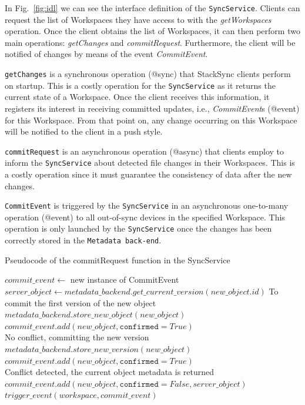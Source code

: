 In Fig.~\ref{fig:idl} we can see the interface definition of the \texttt{SyncService}. Clients can request the list of Workspaces they have access to with the \textit{getWorkspaces} operation. Once the client obtains the list of Workspaces, it can then perform two main operations: \textit{getChanges} and  \textit{commitRequest}. Furthermore, the client will be notified of changes  by means of the event \textit{CommitEvent}.

\texttt{getChanges} is a synchronous operation (@sync) that StackSync clients perform on startup. This is a costly operation for the \texttt{SyncService} as it returns the current state of a Workspace. Once the client receives this information, it registers its interest in receiving committed updates, i.e., \textit{CommitEvent}s (@event) for this Workspace. From that point on, any change occurring on this Workspace will be notified to the client in a push style.

\texttt{commitRequest} is an asynchronous operation (@async) that clients employ to inform the \texttt{SyncService} about
detected file changes in their Workspaces.  This is a  costly operation since it must guarantee the consistency of data after the new changes. 

\texttt{CommitEvent} is triggered by the \texttt{SyncService} in  an asynchronous one-to-many operation (@event) to all out-of-sync devices in the specified Workspace. This operation is only launched by the \texttt{SyncService} once the changes has been correctly stored in the \texttt{Metadata back-end}.

\begin{algorithm}[h]
  \caption{Pseudocode of the commitRequest function in the SyncService}
    \label{alg:commit_pseudocode}
  \begin{algorithmic}[1]
  	\footnotesize
      \State $commit\_event \gets $ new instance of CommitEvent
      	\State $server\_object \gets metadata\_backend.get\_current\_version(new\_object.id)$
          	\Comment To commit the first version of the new object
        	\State $metadata\_backend.store\_new\_object(new\_object)$
        	\State $commit\_event.add(new\_object, \mathtt{confirmed} = True)$
         	\\ \Comment No conflict, committing the new version
			\State $metadata\_backend.store\_new\_version(new\_object)$
			\State $commit\_event.add(new\_object, \mathtt{confirmed} =True)$
        \Else
        	\\
        	\Comment Conflict detected, the current object metadata is returned
        	\State $commit\_event.add(new\_object, \mathtt{confirmed} = False,  server\_object)$
        \EndIf
      \EndFor 
      \State $trigger\_event(workspace, commit\_event)$
    \EndFunction
  \end{algorithmic}
\end{algorithm}

